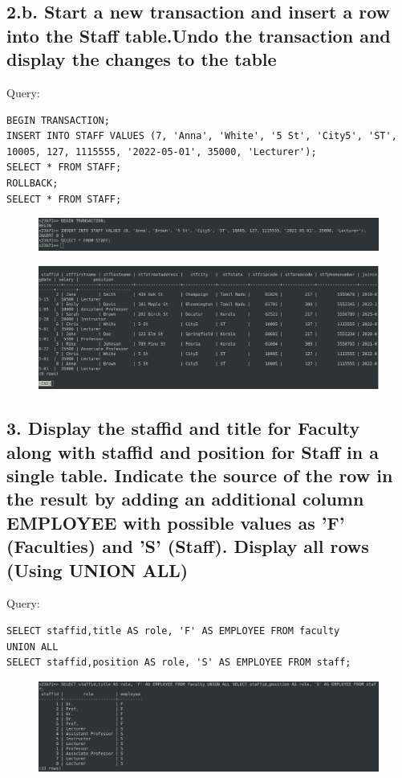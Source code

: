 \documentclass{article}
\begin{document}
\subsection*{2.b. Start a new transaction and insert a row into the Staff table.Undo the transaction and display the changes to the table}
Query:
\begin{Verbatim}[frame=single,framerule=1pt,fontfamily=courier,fontsize=\small]
BEGIN TRANSACTION;
INSERT INTO STAFF VALUES (7, 'Anna', 'White', '5 St', 'City5', 'ST', 
10005, 127, 1115555, '2022-05-01', 35000, 'Lecturer');
SELECT * FROM STAFF;
ROLLBACK;
SELECT * FROM STAFF;
\end{Verbatim}
\begin{figure}[H]
    \centering
    \includegraphics[width=\textwidth]{cycle4/4.2.3.png}
\end{figure}
\begin{figure}[H]
    \centering
    \includegraphics[width=\textwidth]{cycle4/4.2.4.png}
\end{figure}

\subsection*{3. Display the staffid and title for Faculty along with staffid and position for Staff in a single table. Indicate the source of the row in the result by adding an additional column EMPLOYEE with possible values as 'F' (Faculties) and 'S' (Staff). Display all rows (Using UNION ALL)}
Query:
\begin{Verbatim}[frame=single,framerule=1pt,fontfamily=courier,fontsize=\small]
SELECT staffid,title AS role, 'F' AS EMPLOYEE FROM faculty 
UNION ALL 
SELECT staffid,position AS role, 'S' AS EMPLOYEE FROM staff;
\end{Verbatim}
\begin{figure}[H]
    \centering
    \includegraphics[width=\textwidth]{cycle4/4.3.png}
\end{figure}
\end{document}
